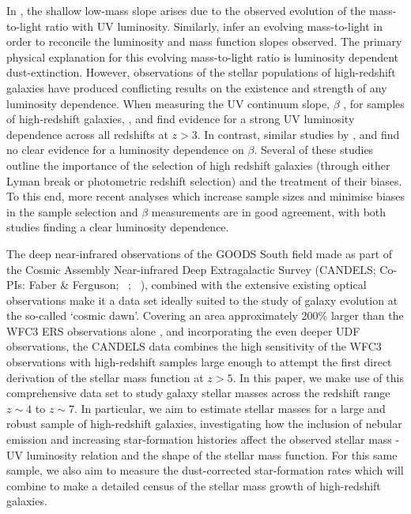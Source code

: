 In \citet{Gonzalez:2011dn}, the shallow low-mass slope arises due to the observed evolution of the mass-to-light ratio with UV luminosity. Similarly, \citet{2012ApJ...752...66L} infer an evolving mass-to-light in order to reconcile the luminosity and mass function slopes observed. The primary physical explanation for this evolving mass-to-light ratio is luminosity dependent dust-extinction. However, observations of the stellar populations of high-redshift galaxies have produced conflicting results on the existence and strength of any luminosity dependence. When measuring the UV continuum slope, $\beta$ \citep{1994ApJ...429..582C}, for samples of high-redshift galaxies, \citet{Wilkins:2011fs}, \citet{2012ApJ...754...83B} and \citet{Bouwens:2013vf} find evidence for a strong UV luminosity dependence across all redshifts at $z > 3$. In contrast, similar studies by \citet{Dunlop:2011jl}, \citet{2012ApJ...756..164F} and \citet{2013MNRAS.429.2456R} find no clear evidence for a luminosity dependence on $\beta$. Several of these studies outline the importance of the selection of high redshift galaxies (through either Lyman break or photometric redshift selection) and the treatment of their biases. To this end, more recent analyses \citep{Bouwens:2013vf,Rogers:2014bn} which increase sample sizes and minimise biases in the sample selection and $\beta$ measurements are in good agreement, with both studies finding a clear luminosity dependence.

The deep near-infrared observations of the GOODS South field made as part of the Cosmic Assembly Near-infrared Deep Extragalactic Survey (CANDELS; Co-PIs: Faber \& Ferguson; \citeauthor{2011ApJS..197...35G}~\citeyear{2011ApJS..197...35G}; \citeauthor{Koekemoer:2011br}~\citeyear{Koekemoer:2011br}), combined with the extensive existing optical observations make it a data set ideally suited to the study of galaxy evolution at the so-called `cosmic dawn'. Covering an area approximately 200\% larger than the WFC3 ERS observations alone \citep{2011ApJS..193...27W}, and incorporating the even deeper UDF observations, the CANDELS data combines the high sensitivity of the WFC3 observations with high-redshift samples large enough to attempt the first direct derivation of the stellar mass function at $z > 5$. In this paper, we make use of this comprehensive data set to study galaxy stellar masses across the redshift range $z \sim 4$ to $z \sim 7$. In particular, we aim to estimate stellar masses for a large and robust sample of high-redshift galaxies, investigating how the inclusion of nebular emission and increasing star-formation histories affect the observed stellar mass - UV luminosity relation and the shape of the stellar mass function. For this same sample, we also aim to measure the dust-corrected star-formation rates which will combine to make a detailed census of the stellar mass growth of high-redshift galaxies. 

